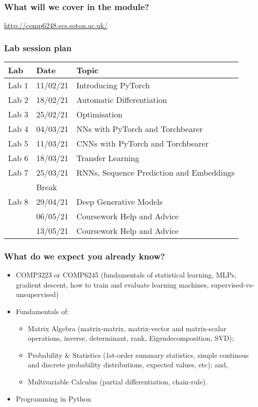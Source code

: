 \documentclass[\beamerclass]{beamer}
\begin{document}
\begin{frame}
	\frametitle{What will we cover in the module?}
	\url{http://comp6248.ecs.soton.ac.uk/}
\end{frame}

\begin{frame}
	\frametitle{Lab session plan}
	
	\begin{center}
	\begin{tabular}{ l l l }
		 Lab & Date & Topic \\ \hline
		 Lab 1  & 11/02/21 & Introducing PyTorch \\ 
		 Lab 2  & 18/02/21 & Automatic Differentiation \\  
		 Lab 3  & 25/02/21 & Optimisation \\
		 Lab 4  & 04/03/21 & NNs with PyTorch and Torchbearer \\
 		 Lab 5  & 11/03/21 & CNNs with PyTorch and Torchbearer \\
 		 Lab 6  & 18/03/21 & Transfer Learning \\
 		 
 		 Lab 7  & 25/03/21 & RNNs, Sequence Prediction and Embeddings \\
 		 \hline
 		 & Break & \\
		 \hline
		 Lab 8  & 29/04/21 & Deep Generative Models \\
		        & 06/05/21 & Coursework Help and Advice \\
 		 	    & 13/05/21 & Coursework Help and Advice \\
	\end{tabular}
	\end{center}
\end{frame}

\begin{frame}
	\frametitle{What do we expect you already know?}
	
	\begin{itemize}
	\item<+-> COMP3223 or COMP6245 (fundamentals of statistical learning, MLPs, gradient descent, how to train and evaluate learning machines, supervised-vs-unsupervised)
	\item<+-> Fundamentals of:
	\begin{itemize}
		\item Matrix Algebra (matrix-matrix, matrix-vector and matrix-scalar operations, inverse, determinant, rank, Eigendecomposition, SVD);
		\item Probability \& Statistics (1st-order summary statistics, simple continous and discrete probability distributions, expected values, etc); and, 
		\item Multivariable Calculus (partial differentiation, chain-rule).
	\end{itemize}
	\item<+-> Programming in Python
	\end{itemize}
\end{frame}
\end{document}
